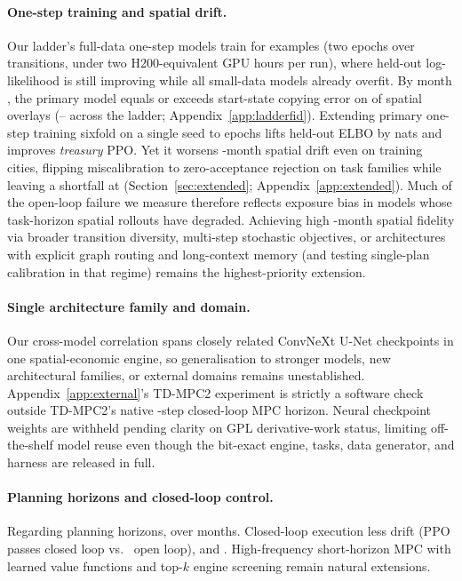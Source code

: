 \paragraph{One-step training and spatial drift.}
Our ladder's full-data one-step models train for \HpSamplesOs{} examples (two epochs over \TrainTransitions{} transitions, under two H200-equivalent GPU hours per run), where held-out log-likelihood is still improving while all \HlSmallN{} small-data models already overfit. By month \Horizon{}, the primary model equals or exceeds start-state copying error on \HorRestN{} of \HorOverlays{} spatial overlays (\HorLadGeMin{}--\HorLadGeMax{} across the ladder; Appendix~\ref{app:ladderfid}). Extending primary one-step training sixfold on a single seed to \ExtTrEpochs{} epochs lifts held-out ELBO by \ExtTrTestElboGain{} nats and improves \emph{treasury} PPO. Yet it worsens \Horizon-month spatial drift even on training cities, flipping miscalibration to zero-acceptance rejection on \ExtTrZeroAccFams{} task families while leaving a \ExtTrTenThouShort{} shortfall at  (Section~\ref{sec:extended}; Appendix~\ref{app:extended}). Much of the open-loop failure we measure therefore reflects exposure bias in models whose task-horizon spatial rollouts have degraded. Achieving high \Horizon-month spatial fidelity via broader transition diversity, multi-step stochastic objectives, or architectures with explicit graph routing and long-context memory (and testing single-plan calibration in that regime) remains the highest-priority extension.

\paragraph{Single architecture family and domain.}
Our cross-model correlation spans \AcClusters{} closely related ConvNeXt U-Net checkpoints in one spatial-economic engine, so generalisation to stronger models, new architectural families, or external domains remains unestablished. Appendix~\ref{app:external}'s TD-MPC2 experiment is strictly a software check outside TD-MPC2's native \ExtMppiHorizon-step closed-loop MPC horizon. Neural checkpoint weights are withheld pending clarity on GPL derivative-work status, limiting off-the-shelf model reuse even though the bit-exact engine, tasks, data generator, and \hpd{} harness are released in full.

\paragraph{Planning horizons and closed-loop control.}
Regarding planning horizons, \RpOpenLoopLead{} over \Horizon{} months. Closed-loop execution \RpSees{} less drift (PPO passes \RlClosed{} closed loop vs.\ \RlOracle{} open loop), and \RpLimitsText. High-frequency short-horizon MPC with learned value functions \citep{jiang2015horizon,hansen2024tdmpc2} and top-$k$ engine screening remain natural extensions.

